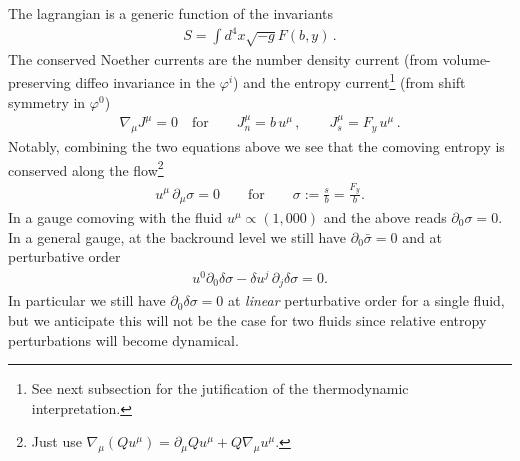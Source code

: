 The lagrangian is a generic function of the invariants
\begin{align}\label{eq:eft_action_exact}
    S=\int d^4x \sqrt{-g} F(b,y)\,.
\end{align}
The conserved Noether currents are the number density current (from volume-preserving diffeo invariance in the $\varphi^i$) and the entropy current\footnote{\label{fn:thermodynamic_interpretation}See next subsection for the jutification of the thermodynamic interpretation.} (from shift symmetry in $\varphi^0$)
\begin{align}\label{eq:noether_currents_nonbaro}
    \nabla_\mu J^\mu=0\quad\text{for}\qquad J_n^\mu = b\, u^\mu\,,\qquad J_s^\mu = F_y \,u^\mu\,.
\end{align}
Notably, combining the two equations above we see that the comoving entropy is conserved along the flow\footnote{Just use $\nabla_\mu(Qu^\mu)=\partial_\mu Q u^\mu+Q\nabla_\mu u^\mu$.}
\begin{align}\label{eq:comoving_entropy_conserved_along_flow}
    u^\mu \,\partial_\mu \sigma=0\qquad\text{for}\qquad \sigma:=\frac{s}{b}=\frac{F_y}{b}.
\end{align}
In a gauge comoving with the fluid $u^\mu\propto (1,000)$ and the above reads $\partial_0\sigma=0$.
In a general gauge, at the backround level we still have $\partial_0\bar{\sigma}=0$ and at perturbative order
\begin{align}\label{eq:entropy_conservation_perturbative}
    u^0\partial_0{\delta \sigma}-\delta u^j\, \partial_j\delta\sigma=0.
\end{align}
In particular we still have $\partial_0\delta\sigma=0$ at \emph{linear} perturbative order for a single fluid, but we anticipate this will not be the case for two fluids since relative entropy perturbations will become dynamical.

